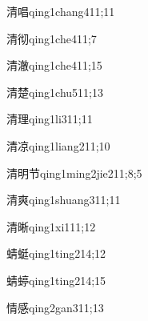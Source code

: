 \begin{verbete}{清唱}{qing1chang4}{11;11}
\end{verbete}

\begin{verbete}{清彻}{qing1che4}{11;7}
\end{verbete}

\begin{verbete}{清澈}{qing1che4}{11;15}
\end{verbete}

\begin{verbete}{清楚}{qing1chu5}{11;13}
\end{verbete}

\begin{verbete}{清理}{qing1li3}{11;11}
\end{verbete}

\begin{verbete}{清凉}{qing1liang2}{11;10}
\end{verbete}

\begin{verbete}{清明节}{qing1ming2jie2}{11;8;5}
\end{verbete}

\begin{verbete}{清爽}{qing1shuang3}{11;11}
\end{verbete}

\begin{verbete}{清晰}{qing1xi1}{11;12}
\end{verbete}

\begin{verbete}{蜻蜓}{qing1ting2}{14;12}
\end{verbete}

\begin{verbete}{蜻蝏}{qing1ting2}{14;15}
\end{verbete}

\begin{verbete}{情感}{qing2gan3}{11;13}
\end{verbete}

